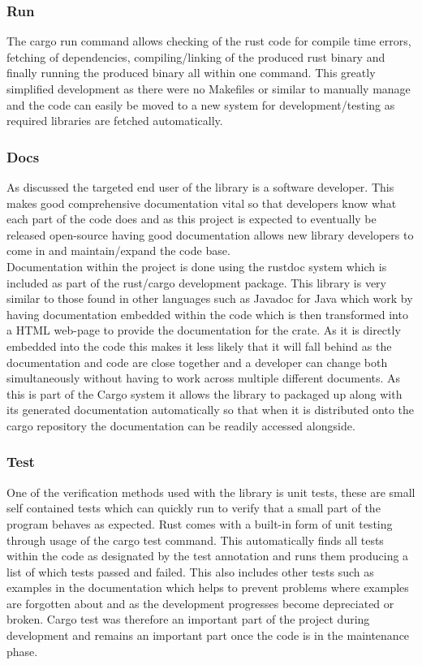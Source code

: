 \documentclass[11pt,a4paper]{report}
\begin{document}
\subsubsection{Run}
The cargo run command allows checking of the rust code for compile time errors, fetching of dependencies, compiling/linking of the produced rust binary and finally running the produced binary all within one command. This greatly simplified development as there were no Makefiles or similar to manually manage and the code can easily be moved to a new system for development/testing as required libraries are fetched automatically.

\subsubsection{Docs}
As discussed the targeted end user of the library is a software developer. This makes good comprehensive documentation vital so that developers know what each part of the code does and as this project is expected to eventually be released open-source having good documentation allows new library developers to come in and maintain/expand the code base.\\

Documentation within the project is done using the rustdoc system which is included as part of the rust/cargo development package. This library is very similar to those found in other languages such as Javadoc for Java which work by having documentation embedded within the code which is then transformed into a HTML web-page to provide the documentation for the crate. As it is directly embedded into the code this makes it less likely that it will fall behind as the documentation and code are close together and a developer can change both simultaneously without having to work across multiple different documents. As this is part of the Cargo system it allows the library to packaged up along with its generated documentation automatically so that when it is distributed onto the cargo repository the documentation can be readily accessed alongside.
\subsubsection{Test}
One of the verification methods used with the library is unit tests, these are small self contained tests which can quickly run to verify that a small part of the program behaves as expected. Rust comes with a built-in form of unit testing through usage of the cargo test command. This automatically finds all tests within the code as designated by the test annotation and runs them producing a list of which tests passed and failed. This also includes other tests such as examples in the documentation which helps to prevent problems where examples are forgotten about and as the development progresses become depreciated or broken. Cargo test was therefore an important part of the project during development and remains an important part once the code is in the maintenance phase.
\end{document}
